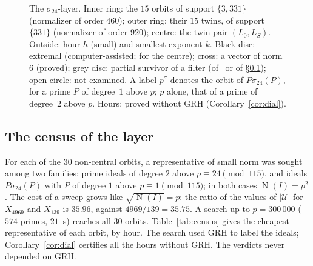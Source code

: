 \documentclass[11pt,a4paper]{amsart}
\theoremstyle{plain}
\theoremstyle{definition}
\newcommand{\Uc}{\mathcal{U}}
\DeclareMathOperator{\Nm}{N}
\newcommand{\Lz}{L_{0}}
\newcommand{\LS}{L_{S}}
\begin{document}
\begin{figure}[ht]
\centering

\caption{The $\sigma_{24}$-layer. Inner ring: the $15$ orbits of support $\{3,331\}$ (normalizer of order $460$); outer ring: their $15$ twins, of support $\{331\}$ (normalizer of order $920$); centre: the twin pair $(\Lz,\LS)$. Outside: hour $h$ (small) and smallest exponent $k$. Black disc: extremal (computer-assisted; \cite{Sak26} for the centre); cross: a vector of norm $6$ (proved); grey disc: partial survivor of a filter (of~\cite{Gau26} or of \S\ref{subsec:census}); open circle: not examined. A label $p^\sigma$ denotes the orbit of $P\sigma_{24}(P)$, for a prime $P$ of degree~$1$ above $p$; $p$ alone, that of a prime of degree~$2$ above $p$. Hours: proved without GRH (Corollary~\ref{cor:dial}).}\label{fig:dial}
\end{figure}

\subsection{The census of the layer}\label{subsec:census}
For each of the $30$ non-central orbits, a representative of small norm was sought among two families: prime ideals of degree $2$ above $p\equiv24\pmod{115}$, and ideals $P\sigma_{24}(P)$ with $P$ of degree $1$ above $p\equiv1\pmod{115}$; in both cases $\Nm(I)=p^2$. The cost of a sweep grows like $\sqrt{\Nm(I)}=p$: the ratio of the values of $|\Uc|$ for $X_{4969}$ and $X_{139}$ is $35.96$, against $4969/139=35.75$. A search up to $p=300\,000$ ($574$ primes, $21$~s) reaches all $30$ orbits. Table~\ref{tab:census} gives the cheapest representative of each orbit, by hour. The search used GRH to label the ideals; Corollary~\ref{cor:dial} certifies all the hours without GRH. The verdicts never depended on GRH.
\end{document}
